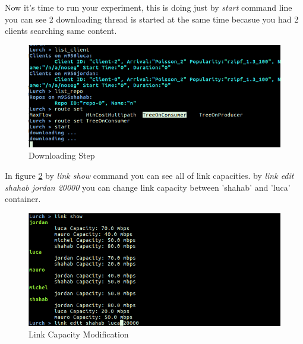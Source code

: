 Now it's time to run your experiment, this is doing just by \textit{start} command line you can see 2 downloading thread is started at the same time becasue you had 2 clients searching same content.  

\begin{figure}[H]

\begin{center}

\includegraphics[scale = 0.35]{Pictures/download.png}

\caption{Downloading Step} \label{download} 

\end{center}

\end{figure}


In figure \ref{capacity} by \textit{link show} command you can see all of link capacities. by \textit{link edit shahab jordan 20000} you can change link capacity between 'shahab' and 'luca' container.

\begin{figure}[H]

\begin{center}

\includegraphics[scale = 0.35]{Pictures/capacity.png}

\caption{Link Capacity Modification} \label{capacity} 

\end{center}

\end{figure}
 
